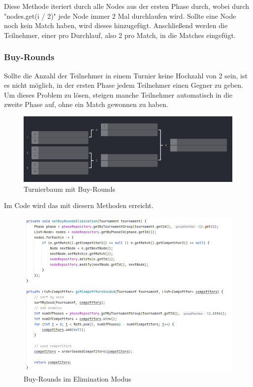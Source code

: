 Diese Methode iteriert durch alle Nodes aus der ersten Phase durch, wobei durch "nodes.get(i / 2)" jede Node immer 2 Mal durchlaufen wird. 
Sollte eine Node noch kein Match haben, wird dieses hinzugefügt. Anschließend werden die Teilnehmer, einer pro Durchlauf, also 2 pro Match, 
in die Matches eingefügt. 

\subsubsection{Buy-Rounds}

Sollte die Anzahl der Teilnehmer in einem Turnier keine Hochzahl von 2 sein, ist es nicht möglich, in der ersten Phase jedem Teilnehmer einen Gegner zu geben. 
Um dieses Problem zu lösen, steigen manche Teilnehmer automatisch in die zweite Phase auf, ohne ein Match gewonnen zu haben.

\begin{figure}[H]
    \includegraphics[scale=0.75]{pics/elimination_buy_rounds.png}
    \caption{Turnierbaum mit Buy-Rounds\cite{implementation-elimination-1}}
\end{figure}

Im Code wird das mit diesern Methoden erreicht.

\begin{figure}[H]
    \includegraphics[scale=0.65]{pics/elimination_setBuyRounds.png}
    \caption{Buy-Rounds im Elimination Modus}
\end{figure}

